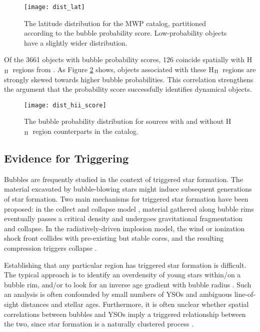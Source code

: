 \documentclass[preprint]{aastex}
\newcommand{\hii}[0]{H$_{\rm II}$}
\begin{document}
\begin{figure}[h!]
\texttt{[image: dist\_lat]}
\caption{The latitude distribution for the MWP catalog, partitioned according to the bubble probability score.
Low-probability objects have a slightly wider distribution.}
\label{fig:dist_lat}
\end{figure}

Of the 3661 objects with bubble probability scores, 126 coincide spatially with \hii\, regions from \cite{Anderson11}. As Figure \ref{fig:hii_score} shows, objects associated with these \hii\, regions are strongly skewed towards higher bubble probabilities. This correlation strengthens the argument that the probability score successfully identifies dynamical objects.

\begin{figure}[h!]
\texttt{[image: dist\_hii\_score]}
\caption{The bubble probability distribution for sources with and without \hii\, region counterparts in the \cite{Anderson11} catalog.}
\label{fig:hii_score}
\end{figure}

\subsection{Evidence for Triggering}

Bubbles are frequently studied in the context of triggered star formation. The material excavated by bubble-blowing stars might induce subsequent generations of star formation. Two main mechanisms for triggered star formation have been proposed: in the collect and collapse model \citep{Dale07}, material gathered along bubble rims eventually passes a critical density and undergoes gravitational fragmentation and collapse. In the radiatively-driven implosion model, the wind or ionization shock front collides with pre-existing but stable cores, and the resulting compression triggers collapse \citep{Bertoldi89}.

Establishing that any particular region has triggered star formation is difficult. The typical approach is to identify an overdensity of young stars within/on a bubble rim, and/or to look for an inverse age gradient with bubble radius \citep{Deharveng05, Zavagno06, Koenig08}. Such an analysis is often confounded by small numbers of YSOs and ambiguous line-of-sight distances and stellar ages. Furthermore, it is often unclear whether spatial correlations between bubbles and YSOs imply a triggered relationship between the two, since star formation is a naturally clustered process \citep{Lada03}.
\end{document}
